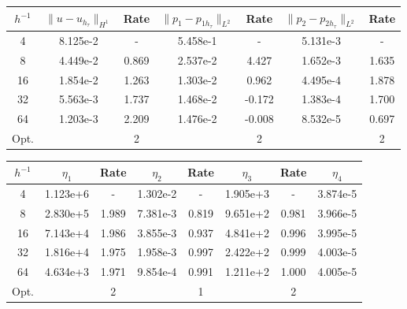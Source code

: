 \begin{center} 
\centering
\begin{tabular}{c|c|c|c|c|c|c}
$h^{-1}$ & $\|u - u_{h_{\tau}}\|_{H^1}$ & Rate & $\|p_1 - p_{1h_{\tau}}\|_{L^2}$ & Rate & $\|p_2 - p_{2h_{\tau}}\|_{L^2}$ & Rate\\\hline
4  & 8.125e-2 & -     & 5.458e-1 & -     & 5.131e-3 & -     \\
8  & 4.449e-2 & 0.869 & 2.537e-2 & 4.427 & 1.652e-3 & 1.635 \\
16 & 1.854e-2 & 1.263 & 1.303e-2 & 0.962 & 4.495e-4 & 1.878 \\
32 & 5.563e-3 & 1.737 & 1.468e-2 & -0.172 & 1.383e-4 & 1.700 \\
64 & 1.203e-3 & 2.209 & 1.476e-2 & -0.008 & 8.532e-5 & 0.697 \\\hline
Opt. & & 2 & & 2 & & 2
\end{tabular}
 \label{tab:bb_bio_space_error}
\end{center}
\begin{center} 
\centering
\begin{tabular}{c|c|c|c|c|c|c|c}
$h^{-1}$ & $\eta_1$ & Rate &  $\eta_2$ & Rate & $\eta_3$ & Rate & $\eta_4$ \\\hline
4  & 1.123e+6 & -     & 1.302e-2 & -     & 1.905e+3 & -     & 3.874e-5 \\
8  & 2.830e+5 & 1.989 & 7.381e-3 & 0.819 & 9.651e+2 & 0.981 & 3.966e-5 \\
16 & 7.143e+4 & 1.986 & 3.855e-3 & 0.937 & 4.841e+2 & 0.996 & 3.995e-5 \\
32 & 1.816e+4 & 1.975 & 1.958e-3 & 0.997 & 2.422e+2 & 0.999 & 4.003e-5 \\
64 & 4.634e+3 & 1.971 & 9.854e-4 & 0.991 & 1.211e+2 & 1.000 & 4.005e-5 \\\hline
Opt. & & 2 & & 1  & & 2 & 
\end{tabular}
 \label{tab:bb_bio_space_est}
\end{center}

